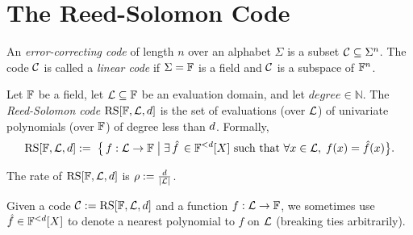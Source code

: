 \chapter{The Reed-Solomon Code}

\begin{definition}
    An \emph{error-correcting code} of length \(n\) over an alphabet \(\Sigma\) is a subset \(\mathcal{C} \subseteq \Sigma^n\). The code \(\mathcal{C}\) is called a \emph{linear code} if
    \(\Sigma = \mathbb{F}\) is a field and \(\mathcal{C}\) is a subspace of \({\mathbb{F}}^n\).
\end{definition}

\begin{definition}
    Let $\mathbb{F}$ be a field, let $\mathcal{L} \subseteq \mathbb{F}$ be an evaluation domain, and let $degree \in \mathbb{N}$. The \emph{Reed-Solomon code} $\mathrm{RS}[\mathbb{F},\mathcal{L},d]$ is the set of evaluations (over $\mathcal{L}$) of univariate polynomials (over $\mathbb{F}$) of degree less than $d$. Formally,
    \[
        \mathrm{RS}[\mathbb{F},\mathcal{L},d]:=\; \bigl\{\, f : \mathcal{L} \to \mathbb{F} \;\big|\; \exists \,\hat{f} \,\in \mathbb{F}^{<d}[X]\text{ such that } \forall x \in \mathcal{L},\; f(x) = \hat{f}(x)\bigr\}.
    \]

    The rate of $\mathrm{RS}[\mathbb{F},\mathcal{L},d]$ is $\rho := \frac{d}{\lvert \mathcal{L} \rvert}$.

    Given a code $\mathcal{C} := \mathrm{RS}[\mathbb{F},\mathcal{L},d]$ and a function $f : \mathcal{L} \to \mathbb{F}$, we sometimes use $\hat{f} \in \mathbb{F}^{<d}[X]$ to denote a nearest polynomial to $f$ on $\mathcal{L}$ (breaking ties arbitrarily).
\end{definition}
